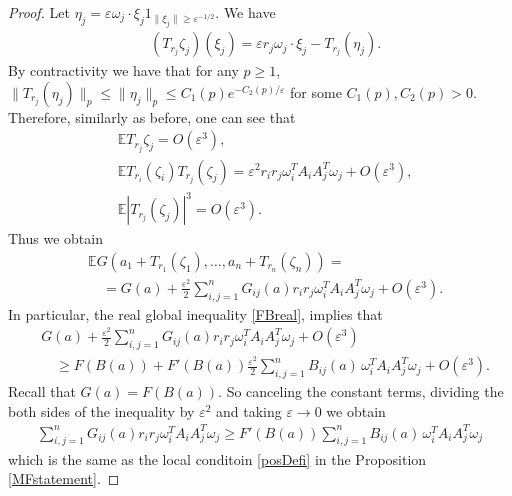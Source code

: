 \documentclass[9pt, a4paper]{amsart}
\newcommand{\1}{{\chi_{}}}%
\numberwithin{equation}{section}
\begin{document}
\begin{proof}
Let $\eta_{j} =  \varepsilon \omega_{j}\cdot \xi_{j}1_{\|\xi_{j}\|\geq \varepsilon^{-1/2}}$. We have 
\begin{align*}
    &(T_{r_{j}}\zeta_{j})(\xi_{j})=\varepsilon r_{j} \omega_{j}\cdot \xi_{j}-T_{r_j}(\eta_{j}).
\end{align*}
By contractivity we have that for any $p\geq 1$, $\|T_{r_j}(\eta_{j})\|_{p}\leq \|\eta_{j}\|_{p} \leq C_{1}(p) e^{-C_{2}(p)/\varepsilon}$ for some $C_{1}(p), C_{2}(p)>0$. Therefore, similarly as before, one can see that 
\begin{align*}
    &\mathbb{E} T_{r_{j}} \zeta_{j} = O(\varepsilon^{3}),\\
    &\mathbb{E}T_{r_{i}}(\zeta_{i}) T_{r_{j}}(\zeta_{j})=\varepsilon^{2} r_{i}r_{j}\omega_{i}^{T}A_{i}A_{j}^{T}\omega_{j}+O(\varepsilon^{3}),\\
    &\mathbb{E}|T_{r_{j}}(\zeta_{j})|^{3} = O(\varepsilon^{3}).
\end{align*}
Thus we obtain 
\begin{align*}
&\mathbb{E}G(a_{1}+T_{r_{1}}(\zeta_{1}),\ldots,a_{n}+T_{r_{n}}(\zeta_{n})) = \\
&\quad= G(a)+\frac{\varepsilon^{2}}{2}\sum_{i,j=1}^{n} G_{ij}(a)r_{i}r_{j}\omega_{i}^{T}A_{i}A_{j}^{T}\omega_{j} + O(\varepsilon^{3}).   
\end{align*}
In particular, the real global inequality \eqref{FBreal}, implies that 
\begin{align*}
    &G(a)+\frac{\varepsilon^{2}}{2}\sum_{i,j=1}^{n} G_{ij}(a)r_{i}r_{j}\omega_{i}^{T}A_{i}A_{j}^{T}\omega_{j} + O(\varepsilon^{3}) \\
    &\quad \geq F(B(a))+F'(B(a))\frac{\varepsilon^{2}}{2}\sum_{i,j=1}^{n}B_{ij}(a)\, \omega_{i}^{T}A_{i}A_{j}^{T}\omega_{j}+O(\varepsilon^{3}).
\end{align*}
Recall that $G(a)=F(B(a))$. So canceling the constant terms, dividing the both sides of the inequality by $\varepsilon^2$ and taking $\varepsilon \to 0$ we obtain
\begin{align*}
    \sum_{i,j=1}^{n} G_{ij}(a)r_{i}r_{j}\omega_{i}^{T}A_{i}A_{j}^{T}\omega_{j} \geq F'(B(a))\sum_{i,j=1}^{n}B_{ij}(a)\, \omega_{i}^{T}A_{i}A_{j}^{T}\omega_{j}
\end{align*}
which is the same as the local conditoin \eqref{posDefi} in the Proposition \ref{MFstatement}.


\end{proof}
\end{document}
